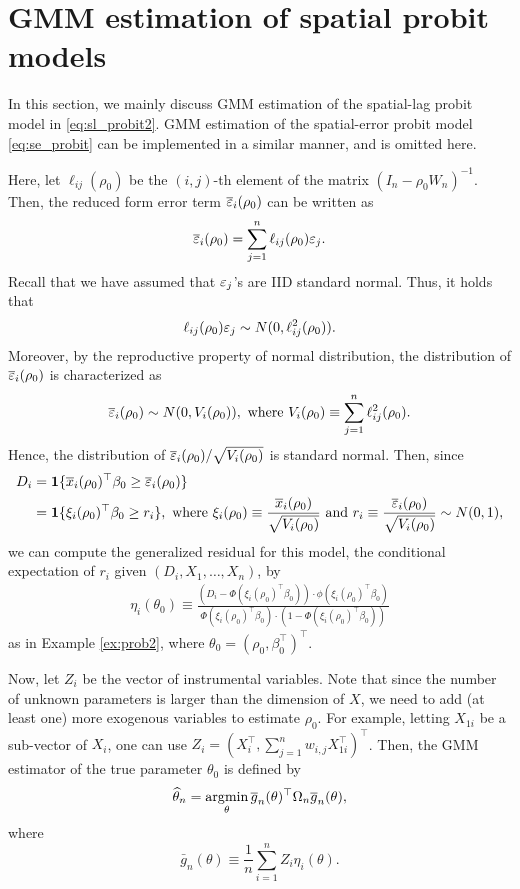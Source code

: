 \documentclass[11pt, A4paper, openany, uplatex]{book}
\begin{document}
\section{GMM estimation of spatial probit models}\label{sec:spGMM}

In this section, we mainly discuss GMM estimation of the spatial-lag probit model in \eqref{eq:sl_probit2}.
GMM estimation of the spatial-error probit model \eqref{eq:se_probit} can be implemented in a similar manner, and is omitted here.

Here, let $\ell_{ij}(\rho_0)$ be the $(i,j)$-th element of the matrix $(I_n - \rho_0 W_n)^{-1}$.
Then, the reduced form error term $\overline{\varepsilon}_{i}(\rho_0)$ can be written as
\[
	\overline{\varepsilon}_{i}(\rho_0) = \sum_{j=1}^n\ell_{ij}(\rho_0)\varepsilon_j.
\]
Recall that we have assumed that $\varepsilon_j$'s are IID standard normal.
Thus, it holds that
\[
	\ell_{ij}(\rho_0)\varepsilon_j \sim N(0, \ell^2_{ij}(\rho_0)).
\]
Moreover, by the reproductive property of normal distribution, the distribution of $\overline{\varepsilon}_{i}(\rho_0)$ is characterized as
\[
	\overline{\varepsilon}_{i}(\rho_0) \sim N(0, V_i(\rho_0)), \text{ where } V_i(\rho_0) \equiv \sum_{j=1}^n\ell^2_{ij}(\rho_0).
\] 
Hence, the distribution of $\overline{\varepsilon}_{i}(\rho_0)/\sqrt{V_i(\rho_0)}$ is standard normal.
Then, since
\begin{align*}
	D_i 
	& = \mathbf{1}\{\overline x_i(\rho_0)^\top \beta_0 \ge  \overline {\varepsilon}_i(\rho_0)\} \\
	& = \mathbf{1}\{\xi_i(\rho_0)^\top \beta_0 \ge  r_i \}, \text{ where } \xi_i(\rho_0) \equiv \frac{\overline x_i(\rho_0)}{\sqrt{V_i(\rho_0)}} \text{ and } r_i \equiv \frac{\overline{\varepsilon}_{i}(\rho_0)}{\sqrt{V_i(\rho_0)}} \sim N(0,1),
\end{align*}
we can compute the generalized residual for this model, the conditional expectation of $r_i$ given $(D_i, X_1, \ldots , X_n)$, by 
\begin{align*}
	\eta_i(\theta_0) \equiv \frac{(D_i - \Phi(\xi_i(\rho_0)^\top \beta_0)) \cdot \phi(\xi_i(\rho_0)^\top \beta_0)}{\Phi(\xi_i(\rho_0)^\top \beta_0) \cdot (1 - \Phi(\xi_i(\rho_0)^\top \beta_0) )}
\end{align*}
as in Example \ref{ex:prob2}, where $\theta_0 = (\rho_0, \beta_0^\top)^\top$.

Now, let $Z_i$ be the vector of instrumental variables.
Note that since the number of unknown parameters is larger than the dimension of $X$, we need to add (at least one) more exogenous variables to estimate $\rho_0$.
For example, letting $X_{1i}$ be a sub-vector of $X_i$, one can use $Z_i = (X^\top_i, \sum_{j=1}^n w_{i,j} X_{1i}^\top)^\top$. Then, the GMM estimator of the true parameter $\theta_0$ is defined by
\begin{align}\label{eq:spGMM}
\widehat{\theta}_n = \operatorname*{\arg\!\min}_{\theta} \overline{g}_n(\theta)^\top \Omega_n \overline{g}_n(\theta),
\end{align}
 where 
\[
	\bar{g}_n(\theta) \equiv \frac{1}{n}\sum_{i=1}^n Z_i \eta_i(\theta).
\]
\end{document}

